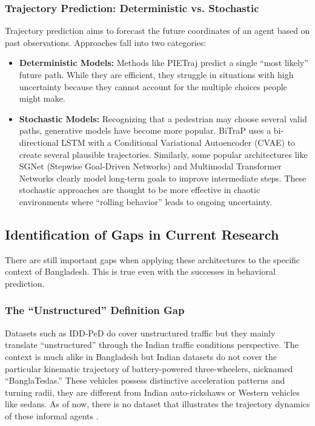 \documentclass[12pt, a4paper]{article}
\begin{document}
\subsubsection{Trajectory Prediction: Deterministic vs. Stochastic}
Trajectory prediction aims to forecast the future coordinates of an agent based on past observations. Approaches fall into two categories:

\begin{itemize}
    \item \textbf{Deterministic Models:} Methods like PIETraj \cite{rasouli2019pie} predict a single ``most likely'' future path. While they are efficient, they struggle in situations with high uncertainty because they cannot account for the multiple choices people might make.
    
    \item \textbf{Stochastic Models:} Recognizing that a pedestrian may choose several valid paths, generative models have become more popular. BiTraP \cite{yao2021bitrap} uses a bi-directional LSTM with a Conditional Variational Autoencoder (CVAE) to create several plausible trajectories. Similarly, some popular architectures like SGNet (Stepwise Goal-Driven Networks) \cite{wang2022stepwise} and Multimodal Transformer Networks \cite{yin2021multimodal} clearly model long-term goals to improve intermediate steps. These stochastic approaches are thought to be more effective in chaotic environments where ``rolling behavior'' \cite{vasudevan2020pedestrian} leads to ongoing uncertainty.
\end{itemize}

\subsection{Identification of Gaps in Current Research}
There are still important gaps when applying these architectures to the specific context of Bangladesh. This is true even with the successes in behavioral prediction.

\subsubsection{The ``Unstructured'' Definition Gap}
Datasets such as IDD-PeD \cite{bokkasam2025pedestrian} do cover unstructured traffic but they mainly translate ``unstructured'' through the Indian traffic conditions perspective. The context is much alike in Bangladesh but Indian datasets do not cover the particular kinematic trajectory of battery-powered three-wheelers, nicknamed ``BanglaTeslas.'' These vehicles possess distinctive acceleration patterns and turning radii, they are different from Indian auto-rickshaws or Western vehicles like sedans. As of now, there is no dataset that illustrates the trajectory dynamics of these informal agents \cite{sun2020scalability}.
\end{document}
